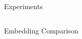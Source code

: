 \documentclass[final]{beamer}
\newlength{\onecolwid}
\newlength{\twocolwid}
\begin{document}
\begin{frame}[t]
\begin{columns}[t]
\begin{column}{\twocolwid}
\begin{columns}[t,totalwidth=\twocolwid]
\begin{column}{\onecolwid}
\begin{block}{Experiments}
                        \end{block}


                    \end{column} %

                \end{columns} %

                \begin{block}{Embedding Comparison}


\end{block}
\end{column}
\end{columns}
\end{frame}
\end{document}
